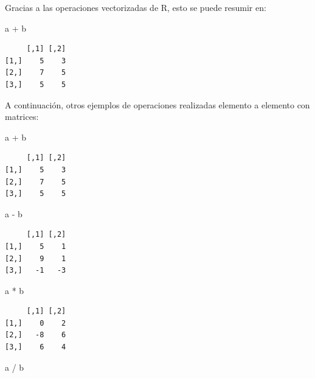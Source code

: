 \documentclass[
]{book}
\newenvironment{Shaded}{\begin{snugshade}}{\end{snugshade}}
\newcommand{\NormalTok}[1]{#1}
\newcommand{\SpecialCharTok}[1]{\textcolor[rgb]{0.00,0.00,0.00}{#1}}
\begin{document}
Gracias a las operaciones vectorizadas de R, esto se puede resumir en:

\begin{Shaded}
\begin{Highlighting}[]
\NormalTok{a }\SpecialCharTok{+}\NormalTok{ b}
\end{Highlighting}
\end{Shaded}

\begin{verbatim}
     [,1] [,2]
[1,]    5    3
[2,]    7    5
[3,]    5    5
\end{verbatim}

A continuación, otros ejemplos de operaciones realizadas elemento a elemento con matrices:

\begin{Shaded}
\begin{Highlighting}[]
\NormalTok{a }\SpecialCharTok{+}\NormalTok{ b}
\end{Highlighting}
\end{Shaded}

\begin{verbatim}
     [,1] [,2]
[1,]    5    3
[2,]    7    5
[3,]    5    5
\end{verbatim}

\begin{Shaded}
\begin{Highlighting}[]
\NormalTok{a }\SpecialCharTok{{-}}\NormalTok{ b}
\end{Highlighting}
\end{Shaded}

\begin{verbatim}
     [,1] [,2]
[1,]    5    1
[2,]    9    1
[3,]   -1   -3
\end{verbatim}

\begin{Shaded}
\begin{Highlighting}[]
\NormalTok{a }\SpecialCharTok{*}\NormalTok{ b}
\end{Highlighting}
\end{Shaded}

\begin{verbatim}
     [,1] [,2]
[1,]    0    2
[2,]   -8    6
[3,]    6    4
\end{verbatim}

\begin{Shaded}
\begin{Highlighting}[]
\NormalTok{a }\SpecialCharTok{/}\NormalTok{ b}
\end{Highlighting}
\end{Shaded}
\end{document}
